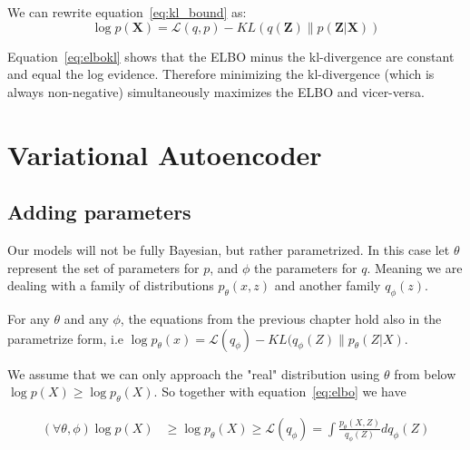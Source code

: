 \documentclass[11pt, a4paper]{report}
\theoremstyle{plain}
\theoremstyle{definition}
\theoremstyle{remark}
\newcommand{\bv}[1]{\boldsymbol{#1}}
\begin{document}
We can rewrite equation~\ref{eq:kl_bound} as:
\begin{equation}\label{eq:elbokl}
\log p(\bv{X}) = \mathcal{L}(q,p) - KL(q(\bv{Z}) \| p(\bv{Z}|\bv{X}))
\end{equation}

Equation~\ref{eq:elbokl} shows that the ELBO minus the kl-divergence are constant
and equal the log evidence. Therefore minimizing the kl-divergence (which is
always non-negative) simultaneously maximizes the ELBO and vicer-versa.

%

\section{Variational Autoencoder}
\subsection{Adding parameters}

Our models will not be fully Bayesian, but rather parametrized.
In this case let $\theta$ represent the set of parameters for $p$, and $\phi$
the parameters for $q$. Meaning we are dealing with a family of distributions
$p_{\theta}(x,z)$ and another family $q_{\phi}(z)$.

For any $\theta$ and any $\phi$, the equations from the previous chapter hold
also in the parametrize form, i.e $\log p_{\theta}(x) = \mathcal{L}(q_{\phi}) -
KL(q_{\phi}(Z) \| p_{\theta}(Z|X)$.

We assume that we can only approach the "real" distribution using
$\theta$ from below $\log p(X) \geq \log p_{\theta}(X)$.
So together with equation~\ref{eq:elbo} we have

\begin{equation}\label{eq:parelbo}
\begin{aligned}
(\forall \theta, \phi)\log p(X) & \geq \log p_{\theta}(X) \geq \mathcal{L}(q_{\phi})
= \int \frac{p_{\theta}(X,Z)}{q_{\phi}(Z)} dq_{\phi}(Z)
\end{aligned}
\end{equation}
\end{document}
